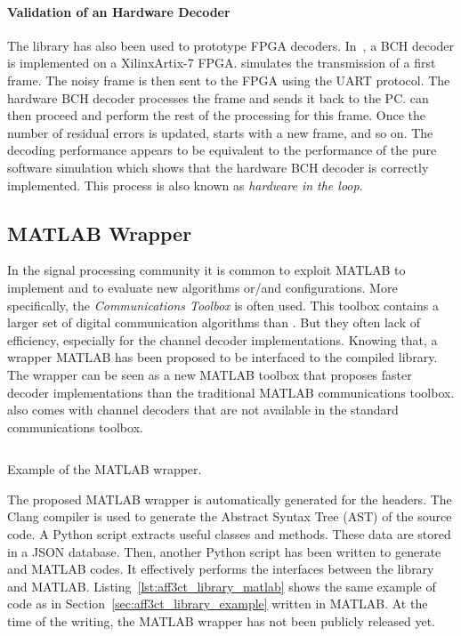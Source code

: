\paragraph{Validation of an Hardware Decoder}

The \AFFECT library has also been used to prototype FPGA decoders.
In~\cite{Cassagne2017a}, a BCH decoder is implemented on a Xilinx\R Artix-7
FPGA. \AFFECT simulates the transmission of a first frame. The noisy frame is
then sent to the FPGA using the UART protocol. The hardware BCH decoder
processes the frame and sends it back to the PC. \AFFECT can then proceed and
perform the rest of the processing for this frame. Once the number of residual
errors is updated, \AFFECT starts with a new frame, and so on. The decoding
performance appears to be equivalent to the performance of the pure software
simulation which shows that the hardware BCH decoder is correctly implemented.
This process is also known as \emph{hardware in the loop}.

\subsection{MATLAB Wrapper}

In the signal processing community it is common to exploit MATLAB to implement
and to evaluate new algorithms or/and configurations. More specifically, the
\emph{Communications Toolbox} is often used. This toolbox contains a larger set
of digital communication algorithms than \AFFECT. But they often lack of
efficiency, especially for the channel decoder implementations. Knowing that, a
wrapper MATLAB has been proposed to be interfaced to the compiled \AFFECT
library. The wrapper can be seen as a new MATLAB toolbox that proposes faster
decoder implementations than the traditional MATLAB communications toolbox.
\AFFECT also comes with channel decoders that are not available in the standard
communications toolbox.

\begin{listing}[htp]
  \inputminted[frame=lines,linenos]{matlab}{\curChapter/src/use_cases/library/repetition_chain.m}
  \caption{Example of the \AFFECT MATLAB wrapper.}
  \label{lst:aff3ct_library_matlab}
\end{listing}

The proposed MATLAB wrapper is automatically generated for the \AFFECT headers.
The Clang compiler is used to generate the Abstract Syntax Tree (AST) of the
\AFFECT source code. A Python script extracts useful classes and methods.
These data are stored in a JSON database. Then, another Python script has been
written to generate \Cxx and MATLAB codes. It effectively performs the
interfaces between the \AFFECT library and MATLAB.
Listing~\ref{lst:aff3ct_library_matlab} shows the same example of code as in
Section~\ref{sec:aff3ct_library_example} written in MATLAB. At the time of the
writing, the MATLAB wrapper has not been publicly released yet.

